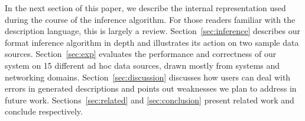 In the next section of this paper, we describe the internal representation
used during the course of the inference algorithm.  For those
readers familiar with the \pads{} description language, this is largely a 
review.  Section~\ref{sec:inference} describes our format inference algorithm
in depth and illustrates its action on two sample data sources.  
Section~\ref{sec:exp} evaluates the performance and correctness of our
system on 15 different ad hoc data sources, drawn mostly from systems
and networking domains.  Section~\ref{sec:discussion} discusses
how users can deal with errors
in generated descriptions and points out weaknesses 
we plan to address in future work.
Sections~\ref{sec:related} and \ref{sec:conclusion} present related work
and conclude respectively.







